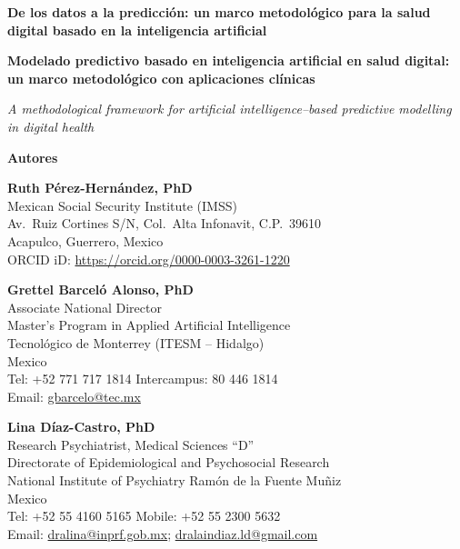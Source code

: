 \documentclass[12pt,a4paper]{article}
\begin{document}
\begin{center}
    {\Large\bfseries De los datos a la predicción: un marco metodológico para la salud digital basado en la inteligencia artificial}

    \vspace{0.8cm}

    {\large\bfseries Modelado predictivo basado en inteligencia artificial en salud digital: un marco metodológico con aplicaciones clínicas}

    \vspace{0.8cm}

    {\large\itshape A methodological framework for artificial intelligence--based predictive modelling in digital health}
\end{center}

\vspace{1cm}

\noindent\textbf{Autores}

\vspace{0.5cm}

\noindent\textbf{Ruth Pérez-Hernández, PhD}\\
Mexican Social Security Institute (IMSS)\\
Av.\ Ruiz Cortines S/N, Col.\ Alta Infonavit, C.P.\ 39610\\
Acapulco, Guerrero, Mexico\\
ORCID iD: \url{https://orcid.org/0000-0003-3261-1220}

\vspace{0.4cm}

\noindent\textbf{Grettel Barceló Alonso, PhD}\\
Associate National Director\\
Master's Program in Applied Artificial Intelligence\\
Tecnológico de Monterrey (ITESM -- Hidalgo)\\
Mexico\\
Tel: +52 771 717 1814 \textbar{} Intercampus: 80 446 1814\\
Email: \href{mailto:gbarcelo@tec.mx}{gbarcelo@tec.mx}

\vspace{0.4cm}

\noindent\textbf{Lina Díaz-Castro, PhD}\\
Research Psychiatrist, Medical Sciences ``D''\\
Directorate of Epidemiological and Psychosocial Research\\
National Institute of Psychiatry Ramón de la Fuente Muñiz\\
Mexico\\
Tel: +52 55 4160 5165 \textbar{} Mobile: +52 55 2300 5632\\
Email: \href{mailto:dralina@inprf.gob.mx}{dralina@inprf.gob.mx}; \href{mailto:dralaindiaz.ld@gmail.com}{dralaindiaz.ld@gmail.com}
\end{document}
